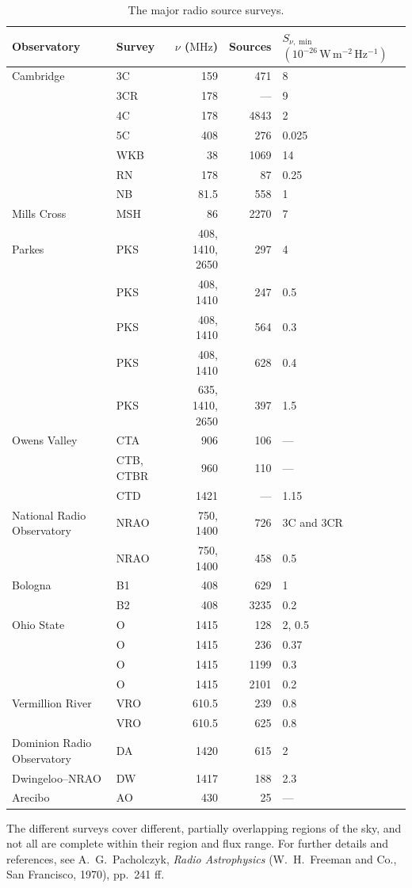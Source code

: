 \begingroup
\renewcommand{\thetable}{14.1}
\begin{table}[htbp]
  \centering
  \caption{The major radio source surveys.}
  \label{tab:14.1}
  \scriptsize
  \setlength{\tabcolsep}{3.6pt}
  \begin{tabular}{@{}llrrl@{}}
    \toprule
    Observatory & Survey & \(\nu\) (\(\mathrm{MHz}\)) & Sources
      & \(S_{\nu,\min}\)
        \((10^{-26}\,\mathrm{W\,m^{-2}\,Hz^{-1}})\) \\
    \midrule
    Cambridge & 3C & 159 & 471 & 8 \\
      & 3CR & 178 & --- & 9 \\
      & 4C & 178 & 4843 & 2 \\
      & 5C & 408 & 276 & 0.025 \\
      & WKB & 38 & 1069 & 14 \\
      & RN & 178 & 87 & 0.25 \\
      & NB & 81.5 & 558 & 1 \\
    Mills Cross & MSH & 86 & 2270 & 7 \\
    Parkes & PKS & 408, 1410, 2650 & 297 & 4 \\
      & PKS & 408, 1410 & 247 & 0.5 \\
      & PKS & 408, 1410 & 564 & 0.3 \\
      & PKS & 408, 1410 & 628 & 0.4 \\
      & PKS & 635, 1410, 2650 & 397 & 1.5 \\
    Owens Valley & CTA & 906 & 106 & --- \\
      & CTB, CTBR & 960 & 110 & --- \\
      & CTD & 1421 & --- & 1.15 \\
    National Radio Observatory & NRAO & 750, 1400 & 726 & 3C and 3CR \\
      & NRAO & 750, 1400 & 458 & 0.5 \\
    Bologna & B1 & 408 & 629 & 1 \\
      & B2 & 408 & 3235 & 0.2 \\
    Ohio State & O & 1415 & 128 & 2, 0.5 \\
      & O & 1415 & 236 & 0.37 \\
      & O & 1415 & 1199 & 0.3 \\
      & O & 1415 & 2101 & 0.2 \\
    Vermillion River & VRO & 610.5 & 239 & 0.8 \\
      & VRO & 610.5 & 625 & 0.8 \\
    Dominion Radio Observatory & DA & 1420 & 615 & 2 \\
    Dwingeloo--NRAO & DW & 1417 & 188 & 2.3 \\
    Arecibo & AO & 430 & 25 & --- \\
    \bottomrule
  \end{tabular}

  \vspace{3pt}
  \parbox{0.96\textwidth}{\scriptsize
  The different surveys cover different, partially overlapping regions of
  the sky, and not all are complete within their region and flux range. For
  further details and references, see A.~G.~Pacholczyk,
  \emph{Radio Astrophysics} (W.~H.~Freeman and Co., San Francisco, 1970),
  pp.~241 ff.}
\end{table}
\endgroup
